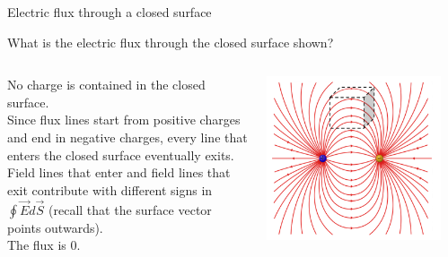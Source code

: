 

%
%
%

\begin{frame}{Electric flux through a closed surface}

\begin{center}
 What is the electric flux through the closed surface shown?\\
\end{center}
\vspace{0.2cm}

\begin{columns}
  \begin{column}{0.38\textwidth}
   {\small
     No charge is contained in the closed surface.\\
     \vspace{0.2cm}
     Since flux lines start from positive charges and end in negative charges,
     every line that enters the closed surface eventually exits.\\
     \vspace{0.2cm}
     Field lines that enter and field lines that exit contribute with different signs in $\oint \vec{E} d\vec{S}$
     (recall that the surface vector points outwards).\\
     \vspace{0.2cm}
     The flux is 0.
   }
   \begin{center}
   \end{center}
  \end{column}
  \begin{column}{0.62\textwidth}
    \includegraphics[width=0.90\textwidth]{./images/schematics/electric_dipole_field_lines_closed_surf_noq.png}\\
  \end{column}
\end{columns}
\end{frame}


